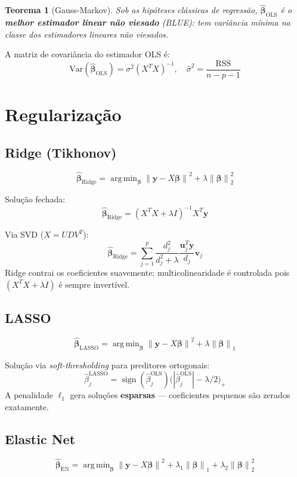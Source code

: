 \documentclass[12pt,a4paper,twoside]{book}
\newtheorem{teorema}{Teorema}[chapter]
\theoremstyle{definition}
\theoremstyle{remark}
\newcommand{\Var}{\mathrm{Var}}
\newcommand{\by}{\bm{y}}
\newcommand{\bbeta}{\bm{\beta}}
\newcommand{\norm}[1]{\left\|#1\right\|}
\newcommand{\abs}[1]{\left|#1\right|}
\DeclareMathOperator*{\argmin}{arg\,min}
\DeclareMathOperator{\sign}{sign}
\begin{document}
\begin{teorema}[Gauss-Markov]
Sob as hipóteses clássicas de regressão, $\hat{\bbeta}_{\mathrm{OLS}}$ é o \textbf{melhor estimador linear não viesado} (BLUE): tem variância mínima na classe dos estimadores lineares não viesados.
\end{teorema}

A matriz de covariância do estimador OLS é:
\[
\Var(\hat{\bbeta}_{\mathrm{OLS}}) = \sigma^2 (X^TX)^{-1}, \quad \hat{\sigma}^2 = \frac{\mathrm{RSS}}{n-p-1}
\]

\section{Regularização}

\subsection{Ridge (Tikhonov)}

\[
\hat{\bbeta}_{\mathrm{Ridge}} = \argmin_\bbeta \norm{\by - X\bbeta}^2 + \lambda \norm{\bbeta}^2_2
\]

Solução fechada:
\[
\hat{\bbeta}_{\mathrm{Ridge}} = (X^TX + \lambda I)^{-1} X^T\by
\]

Via SVD ($X = U D V^T$):
\[
\hat{\bbeta}_{\mathrm{Ridge}} = \sum_{j=1}^p \frac{d_j^2}{d_j^2 + \lambda} \frac{\bm{u}_j^T\by}{d_j} \bm{v}_j
\]
Ridge contrai os coeficientes suavemente; multicolinearidade é controlada pois $(X^TX + \lambda I)$ é sempre invertível.

\subsection{LASSO}

\[
\hat{\bbeta}_{\mathrm{LASSO}} = \argmin_\bbeta \norm{\by - X\bbeta}^2 + \lambda \norm{\bbeta}_1
\]

Solução via \textit{soft-thresholding} para preditores ortogonais:
\[
\hat{\beta}_j^{\mathrm{LASSO}} = \sign(\hat{\beta}_j^{\mathrm{OLS}})\bigl(\abs{\hat{\beta}_j^{\mathrm{OLS}}} - \lambda/2\bigr)_+
\]
A penalidade $\ell_1$ gera soluções \textbf{esparsas} — coeficientes pequenos são zerados exatamente.

\subsection{Elastic Net}

\[
\hat{\bbeta}_{\mathrm{EN}} = \argmin_\bbeta \norm{\by - X\bbeta}^2 + \lambda_1 \norm{\bbeta}_1 + \lambda_2 \norm{\bbeta}^2_2
\]
\end{document}
